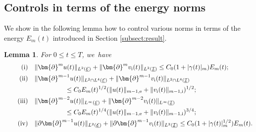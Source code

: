 \documentclass[JEP,XML,SOM,Unicode,NoFloatCountersInSection,published]{cedram}
\newcommand{\cI}{{\mathcal I}}
\newcommand{\cE}{{\mathcal E}}
\newcommand{\ul}[1]{\underline{#1}}
\newtheorem{lemma}[theorem]{Lemma}
\theoremstyle{definition}
\begin{document}
\subsection{Controls in terms of the energy norms}\label{sectCEN}
We show in the following lemma how to control various norms in terms of the energy $E_m(t)$ introduced in Section \ref{subsect:result}.

\begin{lemma}\label{lem:EstDuv}
For $0\leq t\leq T$, we~have\enlargethispage{\baselineskip}
\begin{align*}
\tag{i}\label{lem:EstDuvi} &\quad
\|\bm{\partial}^m u(t)\|_{L^2(\ul{\cE})} + \|\bm{\partial}^m v_\mathrm{i}(t)\|_{L^2(\ul{\cI})} \leq C_0(1+|\gamma(t)|_m)E_m(t); \\
\tag{ii}\label{lem:EstDuvii} &\quad
\|\bm{\partial}^{m-1} u(t)\|_{L^2\cap L^4(\ul{\cE})} + \|\bm{\partial}^{m-1} v_\mathrm{i}(t)\|_{L^2\cap L^4(\ul{\cI})} \\
&\hspace{2cm} \leq C_0 E_m(t)^{1/2} (\|u(t)\|_{m-1,{\rm e}} + \|v_\mathrm{i}(t)\|_{m-1,{\rm i}})^{1/2}; \\
\tag{iii}\label{lem:EstDuviii} &\quad
\|\bm{\partial}^{m-2} u(t)\|_{L^\infty(\ul{\cE})} + \|\bm{\partial}^{m-2} v_\mathrm{i}(t)\|_{L^\infty(\ul{\cI})} \\
&\hspace{2cm} \leq C_0 E_m(t)^{1/4} (\|u(t)\|_{m-1,{\rm e}} + \|v_\mathrm{i}(t)\|_{m-1,{\rm i}})^{3/4}; \\
\tag{iv}\label{lem:EstDuviv} &\quad
\|\partial\bm{\partial}^{m-1} u(t)\|_{L^2(\ul{\cE})} + \|\partial\bm{\partial}^{m-1} v_\mathrm{i}(t)\|_{L^2(\ul{\cI})} \leq C_0(1+|\gamma(t)|_m^{1/2})E_m(t).
\end{align*}
\end{lemma}
\end{document}
